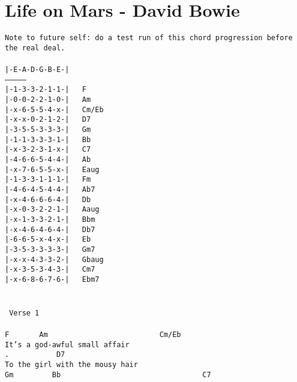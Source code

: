 \newpage
\section{Life on Mars - David Bowie}
\label{Life on Mars - David Bowie}
\texttt{Note to future self: do a test run of this chord progression before
the real deal.\\
\\
|-E-A-D-G-B-E-|\\
---------------\\
|-1-3-3-2-1-1-|\ \ \ F\\
|-0-0-2-2-1-0-|\ \ \ Am\ \ \ \\
|-x-6-5-5-4-x-|\ \ \ Cm/Eb\ \ \\
|-x-x-0-2-1-2-|\ \ \ D7\ \ \ \ \\
|-3-5-5-3-3-3-|\ \ \ Gm\ \ \ \ \\
|-1-1-3-3-3-1-|\ \ \ Bb\ \ \ \ \\
|-x-3-2-3-1-x-|\ \ \ C7\ \ \ \ \\
|-4-6-6-5-4-4-|\ \ \ Ab\ \ \ \ \\
|-x-7-6-5-5-x-|\ \ \ Eaug\ \ \ \\
|-1-3-3-1-1-1-|\ \ \ Fm\ \ \ \ \\
|-4-6-4-5-4-4-|\ \ \ Ab7\ \ \ \\
|-x-4-6-6-6-4-|\ \ \ Db\ \ \ \ \\
|-x-0-3-2-2-1-|\ \ \ Aaug\ \ \ \\
|-x-1-3-3-2-1-|\ \ \ Bbm\ \ \ \\
|-x-4-6-4-6-4-|\ \ \ Db7\ \ \ \\
|-6-6-5-x-4-x-|\ \ \ Eb\ \ \ \ \\
|-3-5-3-3-3-3-|\ \ \ Gm7\ \ \ \ \\
|-x-x-4-3-3-2-|\ \ \ Gbaug\ \ \\
|-x-3-5-3-4-3-|\ \ \ Cm7\ \ \ \\
|-x-6-8-6-7-6-|\ \ \ Ebm7\ \ \ \\
\\
\\
\lbrack\ Verse\ 1\rbrack\\
\\
F\ \ \ \ \ \ \ Am\ \ \ \ \ \ \ \ \ \ \ \ \ \ \ \ \ \ \ \ \ \ \ \ \ \ Cm/Eb\\
It's\ a\ god-awful\ small\ affair\\
.\ \ \ \ \ \ \ \ \ \ \ D7\\
To\ the\ girl\ with\ the\ mousy\ hair\\
Gm\ \ \ \ \ \ \ \ \ Bb\ \ \ \ \ \ \ \ \ \ \ \ \ \ \ \ \ \ \ \ \ \ \ \ \ \ \ \ \ \ \ \ \ C7\\
}
